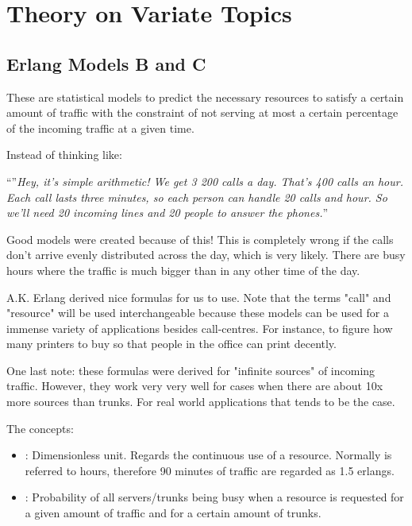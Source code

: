 

\section{Theory on Variate Topics}

\subsection{Erlang Models B and C}
\par These are statistical models to predict the necessary resources to satisfy a certain amount of traffic with the constraint of not serving at most a certain percentage of the incoming traffic at a given time. 
\par Instead of thinking like:
\begin{center}
    ``''\textit{Hey, it's simple arithmetic! We get 3 200 calls a day. That's 400 calls an hour. Each call lasts three minutes, so each person can handle 20 calls and hour. So we'll need 20 incoming  lines and 20 people to answer the phones.}''
\end{center}
Good models were created because of this! This is completely wrong if the calls don't arrive evenly distributed across the day, which is very likely. There are busy hours where the traffic is much bigger than in any other time of the day. 
\par A.K. Erlang derived nice formulas for us to use. Note that the terms "call" and "resource" will be used interchangeable because these models can be used for a immense variety of applications besides call-centres. For instance, to figure how many printers to buy so that people in the office can print decently.
\par One last note: these formulas were derived for "infinite sources" of incoming traffic. However, they work very very well for cases when there are about 10x more sources than trunks. For real world applications that tends to be the case. 

\par The concepts:
\begin{itemize}
    \item {}: Dimensionless unit. Regards the continuous use of a resource. Normally is referred to hours, therefore 90 minutes of traffic are regarded as 1.5 erlangs.
    \item {}: Probability of all servers/trunks being busy when a resource is requested for a given amount of traffic and for a certain amount of trunks.
\end{itemize}



